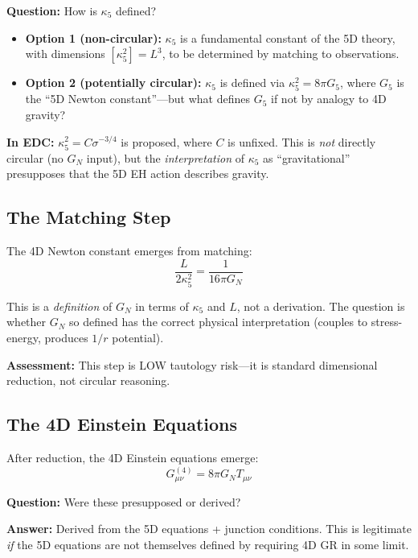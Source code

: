 \documentclass[11pt,a4paper]{article}
\begin{document}
\textbf{Question:} How is $\kappa_5$ defined?

\begin{itemize}
\item \textbf{Option 1 (non-circular):} $\kappa_5$ is a fundamental constant
of the 5D theory, with dimensions $[\kappa_5^2] = L^3$, to be determined by
matching to observations.

\item \textbf{Option 2 (potentially circular):} $\kappa_5$ is defined via
$\kappa_5^2 = 8\pi G_5$, where $G_5$ is the ``5D Newton constant''---but
what defines $G_5$ if not by analogy to 4D gravity?
\end{itemize}

\textbf{In EDC:} $\kappa_5^2 = C \sigma^{-3/4}$ is proposed, where $C$ is
unfixed. This is \textit{not} directly circular (no $G_N$ input), but the
\textit{interpretation} of $\kappa_5$ as ``gravitational'' presupposes that
the 5D EH action describes gravity.

\subsection{The Matching Step}

The 4D Newton constant emerges from matching:
\[
\frac{L}{2\kappa_5^2} = \frac{1}{16\pi G_N}
\]

This is a \textit{definition} of $G_N$ in terms of $\kappa_5$ and $L$, not
a derivation. The question is whether $G_N$ so defined has the correct
physical interpretation (couples to stress-energy, produces $1/r$ potential).

\textbf{Assessment:} This step is LOW tautology risk---it is standard
dimensional reduction, not circular reasoning.

\subsection{The 4D Einstein Equations}

After reduction, the 4D Einstein equations emerge:
\[
G_{\mu\nu}^{(4)} = 8\pi G_N T_{\mu\nu}
\]

\textbf{Question:} Were these presupposed or derived?

\textbf{Answer:} Derived from the 5D equations + junction conditions. This
is legitimate \textit{if} the 5D equations are not themselves defined by
requiring 4D GR in some limit.

\end{document}
